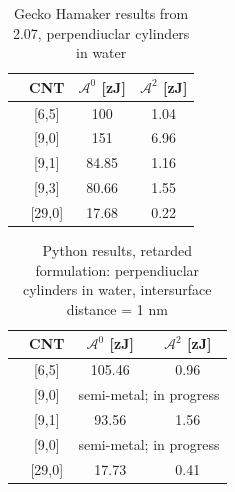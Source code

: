 \documentclass[onecolumn,letterpaper,amsmath,amssymb,floatfix,aps,superscriptaddress]{revtex4}
\begin{document}
\begin{table}[ht]
\caption{Gecko Hamaker results from 2.07, perpendiuclar cylinders in water}
\centering
\begin{tabular}{l c|c|c}
  \hline  
  &\hspace{0.25in}CNT \hspace{0.25in}& \hspace{0.25in}$\mathcal{A}^{0}$    [zJ] \hspace{0.25in}& \hspace{0.25in}$\mathcal{A}^{2}$    [zJ] \hspace{0.25in}\\
  \hline\hline 
  &[6,5]  & 100 & 1.04 \\
  \hline
  &[9,0]  & 151 & 6.96 \\
  \hline
  &[9,1]  & 84.85 & 1.16 \\
  \hline
  &[9,3]  & 80.66 & 1.55 \\
  \hline
  &[29,0] & 17.68 & 0.22 \\
  \hline  
\end{tabular}
\label{table:nonlin}
\end{table}

\begin{table}[ht]
\caption{Python results, retarded formulation: perpendiuclar cylinders in water, intersurface distance = 1 nm}
\centering
\begin{tabular}{l c|c|c}
  \hline  
  &\hspace{0.25in}CNT \hspace{0.25in}& \hspace{0.25in}$\mathcal{A}^{0}$    [zJ] \hspace{0.25in}& \hspace{0.25in}$\mathcal{A}^{2}$    [zJ] \hspace{0.25in}\\
  \hline\hline 
  &[6,5]  & 105.46 & 0.96 \\
  \hline
  &[9,0]  & \multicolumn{2}{c}{semi-metal; in progress}\\
  \hline
  &[9,1]  & 93.56 & 1.56 \\
  \hline
  &[9,0]  & \multicolumn{2}{c}{semi-metal; in progress}\\
  \hline
  &[29,0] & 17.73 & 0.41 \\
  \hline  
\end{tabular}
\label{table:nonlin}
\end{table}
\end{document}

